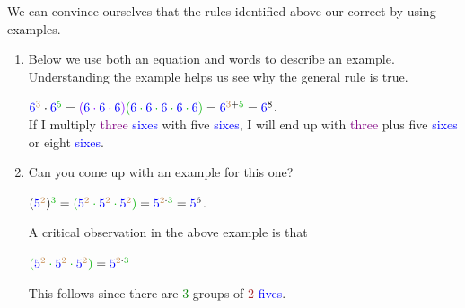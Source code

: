 \documentclass{article}
\begin{document}
\begin{enumerate}[resume, topsep=0pt]
  \begin{solution} 
    We can convince ourselves that the rules identified
      above our correct by using examples.
      \begin{enumerate}
      \item[(b)] Below we use both an equation and words to describe an
        example. Understanding the example helps us see why the general
        rule is true.
        \begin{center} $\textcolor{blue}{6}^{\textcolor{brown}{3}} \cdot\textcolor{blue}{6}^{\textcolor{green!70!black}{5}} = \textcolor{purple}{(\textcolor{blue}{6} \cdot \textcolor{blue}{6} \cdot \textcolor{blue}{6})}\textcolor{green!70!black}{ (\textcolor{blue}{6}\cdot \textcolor{blue}{6} \cdot \textcolor{blue}{6} \cdot \textcolor{blue}{6} \cdot \textcolor{blue}{6}) }= \textcolor{blue}{6}^{\textcolor{brown}{3}+\textcolor{green!70!black}{5}} =\textcolor{blue}{6}^8$. \\
          If I multiply \textcolor{purple}{three} \textcolor{blue}{sixes}
          with \textcolor{green!70!black}{five} \textcolor{blue}{sixes}, I
          will end up with \textcolor{purple}{three} plus
          \textcolor{green!70!black}{five} \textcolor{blue}{sixes} or
          eight \textcolor{blue}{sixes}. \end{center}
      \item[(c)] Can you come up with an example for this one?
        \begin{center}
          $(\textcolor{blue}{5}^{\textcolor{brown}{2}}
          )^{\textcolor{green!70!black}{3}} =
          \textcolor{green!70!black}{(\textcolor{blue}{5}^{\textcolor{brown}{2}}
            \cdot \textcolor{blue}{5}^{\textcolor{brown}{2}} \cdot
            \textcolor{blue}{5}^{\textcolor{brown}{2}} )}=
          \textcolor{blue}{5}^{\textcolor{brown}{2}\cdot
            \textcolor{green!70!black}{3}} =\textcolor{blue}{5}^6$.
        \end{center}
        A critical observation in the above example is that \begin{center}
          $\textcolor{green!70!black}{(\textcolor{blue}{5}^{\textcolor{brown}{2}}
            \cdot \textcolor{blue}{5}^{\textcolor{brown}{2}} \cdot
            \textcolor{blue}{5}^{\textcolor{brown}{2}} )}=
          \textcolor{blue}{5}^{\textcolor{brown}{2}\cdot
            \textcolor{green!70!black}{3}}$
        \end{center}
        This follows since there are \textcolor{green}{3} groups of
        \textcolor{brown}{2} \textcolor{blue}{fives}.
      \end{enumerate} 
  \end{solution}


\end{enumerate}
\end{document}
